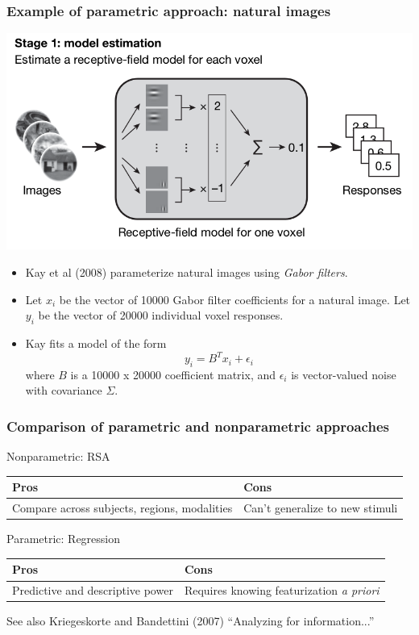\documentclass{beamer}
\begin{document}
\begin{frame}
\frametitle{Example of parametric approach: natural images}
\begin{center}
\includegraphics[scale = 0.2]{kay_stage1.png}
\end{center}
\begin{itemize}
\item Kay et al (2008) parameterize natural images using \emph{Gabor filters}.
\item Let $x_i$ be the vector of 10000 Gabor filter coefficients for a natural image.
Let $y_i$ be the vector of 20000 individual voxel responses.
\item Kay fits a model of the form
\[
y_i = B^T x_i + \epsilon_i
\]
where $B$ is a 10000 x 20000 coefficient matrix, and $\epsilon_i$ is vector-valued noise with covariance $\Sigma$.
\end{itemize}
\end{frame}

\begin{frame}
\frametitle{Comparison of parametric and nonparametric approaches}
Nonparametric: RSA
\begin{tabular}[t]{|p{5cm}|p{5cm}|}
\firsthline
Pros & Cons\\ \hline
Compare across subjects, regions, modalities & Can't generalize to new stimuli\\
\hline
\end{tabular}

\vspace{0.2in}
Parametric: Regression
\begin{tabular}[t]{|p{5cm}|p{5cm}|}
\firsthline
Pros & Cons\\ \hline
Predictive and descriptive power & Requires knowing featurization \emph{a priori}\\
\hline
\end{tabular}

\vspace{0.2in}
See also Kriegeskorte and Bandettini (2007) ``Analyzing for information...''
\end{frame}
\end{document}
